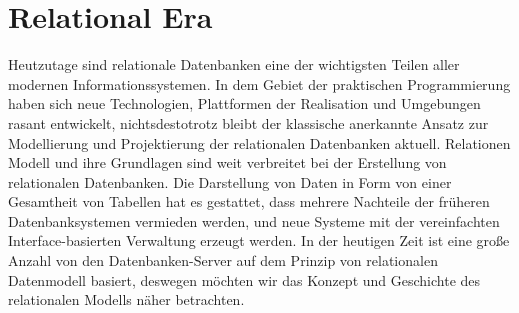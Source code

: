 


















\section{Relational Era} %


Heutzutage sind relationale Datenbanken eine der wichtigsten Teilen aller modernen Informationssystemen. In dem Gebiet der praktischen Programmierung haben sich neue Technologien, Plattformen der Realisation und Umgebungen rasant entwickelt, nichtsdestotrotz bleibt der klassische anerkannte Ansatz zur Modellierung und Projektierung der relationalen Datenbanken aktuell. Relationen Modell und ihre Grundlagen sind weit verbreitet bei der Erstellung von relationalen Datenbanken. Die Darstellung von Daten in Form von einer Gesamtheit von Tabellen hat es gestattet, dass mehrere Nachteile der früheren Datenbanksystemen vermieden werden, und neue Systeme mit der vereinfachten Interface-basierten Verwaltung erzeugt werden. In der heutigen Zeit ist eine große Anzahl von den Datenbanken-Server auf dem Prinzip von relationalen Datenmodell basiert, deswegen möchten wir das Konzept und Geschichte des relationalen Modells näher betrachten.


